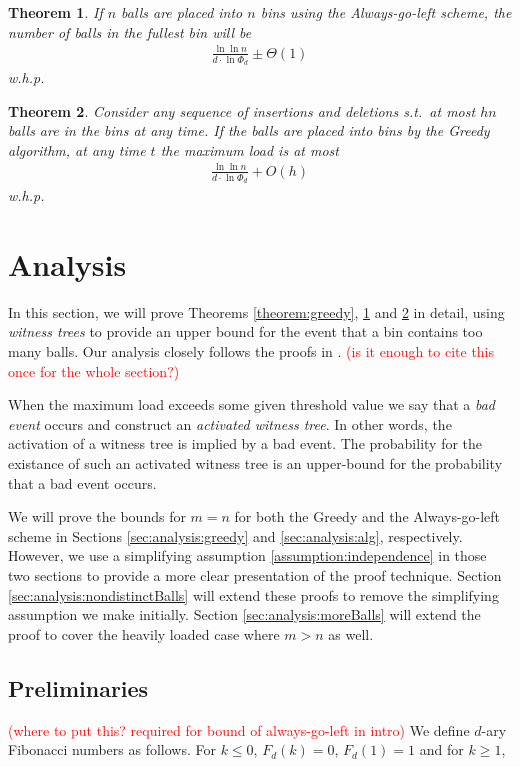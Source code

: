 \documentclass[a4paper,12pt]{article}
\newcommand\todo[1]{\textcolor{red}{(#1)}}
\newtheorem{theorem}{Theorem}
\begin{document}
\begin{theorem}
\label{theorem:agln}
If $n$ balls are placed into $n$ bins using the Always-go-left scheme, the number of balls in the fullest bin will be 
\begin{align}
\frac{\ln\ln n}{d \cdot \ln \Phi_d} \pm \Theta(1)
\end{align}
w.h.p.
\end{theorem}

\begin{theorem}
\label{theorem:algm}
Consider any sequence of insertions and deletions s.t.~at most $hn$ balls are in the bins at any time. If the balls are placed into bins by the Greedy algorithm, at any time $t$ the maximum load is at most 
\begin{align}
\frac{\ln\ln n}{d \cdot \ln \Phi_d} + O(h)
\end{align}
w.h.p.
\end{theorem}

\section{Analysis}
\label{sec:analysis}
In this section, we will prove Theorems \ref{theorem:greedy}, \ref{theorem:agln} and \ref{theorem:algm} in detail, using \emph{witness trees} to provide an upper bound for the event that a bin contains too many balls. Our analysis closely follows the proofs in \cite{VOC03}. \todo{is it enough to cite this once for the whole section?}

When the maximum load exceeds some given threshold value we say that a \emph{bad event} occurs and construct an \emph{activated witness tree}. In other words, the activation of a witness tree is implied by a bad event. The probability for the existance of such an activated witness tree is an upper-bound for the probability that a bad event occurs.

We will prove the bounds for $m=n$ for both the Greedy and the Always-go-left scheme in Sections \ref{sec:analysis:greedy} and \ref{sec:analysis:alg}, respectively. However, we use a simplifying assumption \ref{assumption:independence} in those two sections to provide a more clear presentation of the proof technique. Section \ref{sec:analysis:nondistinctBalls} will extend these proofs to remove the simplifying assumption we make initially. Section \ref{sec:analysis:moreBalls} will extend the proof to cover the heavily loaded case where $m > n$ as well.


\subsection{Preliminaries}
\label{sec:preliminaries}
\todo{where to put this? required for  bound of always-go-left in intro}
We define $d$-ary Fibonacci numbers as follows. For $k \leq0$, $F_d(k) = 0$, $F_d(1) = 1$ and for $k \geq 1$,
\end{document}
